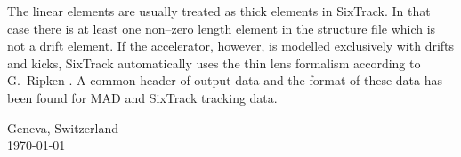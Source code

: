 \begin{titlepage}
The linear elements are usually treated as thick elements in SixTrack\@.
In that case there is at least one non--zero length element in the structure file which is not a drift element.
If the accelerator, however, is modelled exclusively with drifts and kicks, SixTrack automatically uses the thin lens formalism according to G.~Ripken \cite{Ripken95}.
A common header of output data and the format of these data has been found for MAD and SixTrack tracking data.

\vfill
\begin{center}
    Geneva, Switzerland \\
    \today
\end{center}

\end{titlepage}
